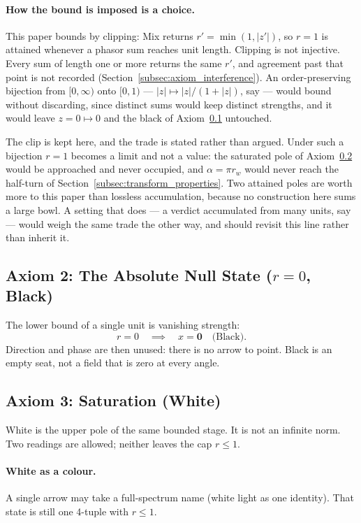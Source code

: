\documentclass[12pt, a4paper]{article}
\begin{document}
\paragraph{How the bound is imposed is a choice.}
This paper bounds by clipping: Mix returns $r'=\min(1,|z'|)$, so
$r=1$ is attained whenever a phasor sum reaches unit length. Clipping
is not injective. Every sum of length one or more returns the same
$r'$, and agreement past that point is not recorded
(Section~\ref{subsec:axiom_interference}). An order-preserving
bijection from $[0,\infty)$ onto $[0,1)$ --- $|z|\mapsto|z|/(1+|z|)$,
say --- would bound without discarding, since distinct sums would keep
distinct strengths, and it would leave $z=0\mapsto 0$ and the black of
Axiom~\ref{subsec:axiom_null} untouched.

The clip is kept here, and the trade is stated rather than argued.
Under such a bijection $r=1$ becomes a limit and not a value: the
saturated pole of Axiom~\ref{subsec:axiom_white} would be approached
and never occupied, and $\alpha=\pi r_w$ would never reach the
half-turn of Section~\ref{subsec:transform_properties}. Two attained
poles are worth more to this paper than lossless accumulation, because
no construction here sums a large bowl. A setting that does --- a
verdict accumulated from many units, say --- would weigh the same
trade the other way, and should revisit this line rather than inherit
it.

\subsection{Axiom 2: The Absolute Null State ($r = 0$, Black)}
\label{subsec:axiom_null}
The lower bound of a single unit is vanishing strength:
\begin{equation}
    r = 0 \quad \implies \quad x = \mathbf{0}
    \quad \text{(Black)}.
    \label{eq:null_state}
\end{equation}
Direction and phase are then unused: there is no arrow to point.
Black is an empty seat, not a field that is zero at every angle.

\subsection{Axiom 3: Saturation (White)}
\label{subsec:axiom_white}
White is the upper pole of the same bounded stage. It is not an infinite
norm. Two readings are allowed; neither leaves the cap $r\le 1$.

\paragraph{White as a colour.}
A single arrow may take a full-spectrum name (white light as one
identity). That state is still one 4-tuple with $r\le 1$.
\end{document}
